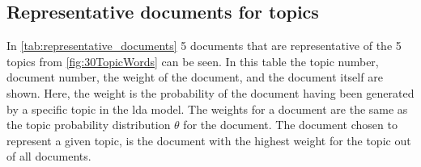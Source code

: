 \subsection{Representative documents for topics}
In \autoref{tab:representative_documents} 5 documents that are representative of the 5 topics from \autoref{fig:30TopicWords} can be seen.
In this table the topic number, document number, the weight of the document, and the document itself are shown.
Here, the weight is the probability of the document having been generated by a specific topic in the \gls{lda} model.
The weights for a document are the same as the topic probability distribution $\theta$ for the document.
The document chosen to represent a given topic, is the document with the highest weight for the topic out of all documents.



